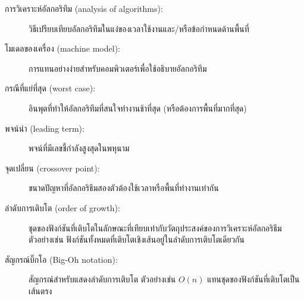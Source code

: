 \begin{description}

\item[การวิเคราะห์อัลกอริทึม (analysis of algorithms):] วิธีเปรียบเทียบอัลกอริทึมในแง่ของเวลาใช้งานและ/หรือข้อกำหนดด้านพื้นที่

\item[โมเดลของเครื่อง (machine model):] การแทนอย่างง่ายสำหรับคอมพิวเตอร์เพื่อใช้อธิบายอัลกอริทึม

\item[กรณีที่แย่ที่สุด (worst case):] อินพุตที่ทำให้อัลกอริทึมที่สนใจทำงานช้าที่สุด (หรือต้องการพื้นที่มากที่สุด)

\item[พจน์นำ (leading term):] พจน์ที่มีเลขชี้กำลังสูงสุดในพหุนาม

\item[จุดเปลี่ยน (crossover point):] ขนาดปัญหาที่อัลกอริธึมสองตัวต้องใช้เวลาหรือพื้นที่ทำงานเท่ากัน

\item[ลำดับการเติบโต (order of growth):] ชุดของฟังก์ชันที่เติบโตในลักษณะที่เทียบเท่ากับวัตถุประสงค์ของการวิเคราะห์อัลกอริธึม 
ตัวอย่างเช่น ฟังก์ชันทั้งหมดที่เติบโตเชิงเส้นอยู่ในลำดับการเติบโตเดียวกัน

\item[สัญกรณ์บิ๊กโอ (Big-Oh notation):] สัญกรณ์สำหรับแสดงลำดับการเติบโต ตัวอย่างเช่น $O(n)$ แทนชุดของฟังก์ชันที่เติบโตเป็นเส้นตรง


\end{description}

